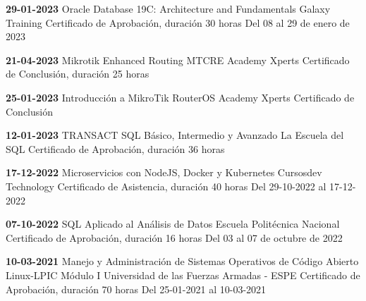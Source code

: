 
\begin{devent}
    \cvevent
	{\textbf{29-01-2023}}
	{Oracle Database 19C: Architecture and Fundamentals}
	{Galaxy Training}
	{Certificado de Aprobación, duración 30 horas}
	{Del 08 al 29 de enero de 2023}
\end{devent}

\begin{devent}
    \cvevent
	{\textbf{21-04-2023}}
	{Mikrotik Enhanced Routing MTCRE}
	{Academy Xperts}
	{Certificado de Conclusión, duración 25 horas}
	{}
\end{devent}

\begin{levent}
    \cvevent
	{\textbf{25-01-2023}}
	{Introducción a MikroTik RouterOS}
	{Academy Xperts}
	{Certificado de Conclusión}
	{}
\end{levent}

\begin{devent}
    \cvevent
	{\textbf{12-01-2023}}
	{TRANSACT SQL Básico, Intermedio y Avanzado}
	{La Escuela del SQL}
	{Certificado de Aprobación, duración 36 horas}
	{}
\end{devent}


\begin{levent}
    \cvevent
	{\textbf{17-12-2022}}
	{Microservicios con NodeJS, Docker y Kubernetes}
	{Cursosdev Technology}
	{Certificado de Asistencia, duración 40 horas}
	{Del 29-10-2022 al 17-12-2022}
\end{levent}

\begin{devent}
    \cvevent
	{\textbf{07-10-2022}}
	{SQL Aplicado al Análisis de Datos}
	{Escuela Politécnica Nacional}
	{Certificado de Aprobación, duración 16 horas}
	{Del 03 al 07 de octubre de 2022}
\end{devent}

\begin{devent}
    \cvevent
	{\textbf{10-03-2021}}
	{Manejo y Administración de Sistemas Operativos de Código Abierto Linux-LPIC Módulo I}
	{Universidad de las Fuerzas Armadas - ESPE}
	{Certificado de Aprobación, duración 70 horas}
	{Del 25-01-2021 al 10-03-2021}
\end{devent}



